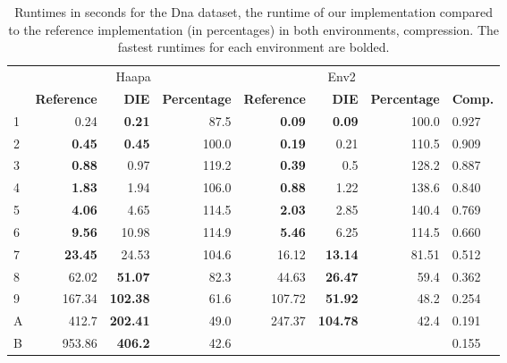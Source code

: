 \documentclass[english,twoside,censored,csm,algorithms-track-2020]{HYthesisML}
\theoremstyle{plain}
\theoremstyle{definition}
\begin{document}
\begin{center}
  \begin{table}
  \hspace{-1cm}
  \begin{tabular} {|l|r r r|r r r|l|}
    \hline
     & \multicolumn{3}{c}{Haapa} & \multicolumn{3}{c}{Env2} & \\
     \textbf{\text{\#}} & \textbf{Reference} & \textbf{DIE} & \textbf{Percentage}  & \textbf{Reference} & \textbf{DIE} & \textbf{Percentage} & \textbf{Comp.} \\
     \hline
     1 & 0.24            & \textbf{0.21}   & 87.5   & \textbf{0.09}  & \textbf{0.09}   & 100.0           & 0.927 \\
     2 & \textbf{0.45}   & \textbf{0.45}   & 100.0  & \textbf{0.19}  & 0.21            & 110.5           & 0.909 \\
     3 & \textbf{0.88}   & 0.97            & 119.2  & \textbf{0.39}  & 0.5             & 128.2           & 0.887 \\
     4 & \textbf{1.83}   & 1.94            & 106.0  & \textbf{0.88}  & 1.22            & 138.6           & 0.840 \\
     5 & \textbf{4.06}   & 4.65            & 114.5  & \textbf{2.03}  & 2.85            & 140.4           & 0.769 \\
     6 & \textbf{9.56}   & 10.98           & 114.9  & \textbf{5.46}  & 6.25            & 114.5           & 0.660 \\
     7 & \textbf{23.45}  & 24.53           & 104.6  & 16.12          & \textbf{13.14}  & 81.51           & 0.512 \\
     8 & 62.02           & \textbf{51.07}  & 82.3   & 44.63          & \textbf{26.47}  & 59.4            & 0.362 \\
     9 & 167.34          & \textbf{102.38} & 61.6   & 107.72         & \textbf{51.92}  & 48.2            & 0.254 \\
     A & 412.7           & \textbf{202.41} & 49.0   & 247.37         & \textbf{104.78} & 42.4            & 0.191 \\
     B & 953.86          & \textbf{406.2}  & 42.6   &                &                 &                 & 0.155 \\
\hline

  \end{tabular}
  \caption{Runtimes in seconds for the Dna dataset, the runtime of our implementation compared to the reference implementation (in percentages) in both environments, compression. The fastest runtimes for each environment are bolded.}
  \label{runtimes-dna}
  \end{table}
\end{center}
\end{document}
